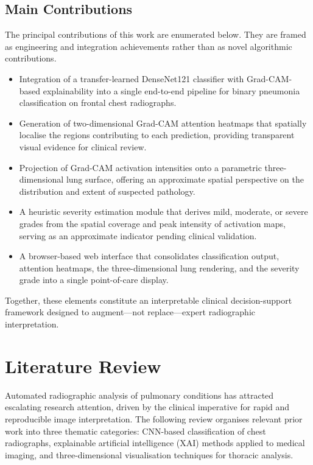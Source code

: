 \documentclass[conference]{IEEEtran}
\begin{document}
\subsection{Main Contributions}
The principal contributions of this work are enumerated below. They are framed as engineering and integration achievements rather than as novel algorithmic contributions.
\begin{itemize}
    \item Integration of a transfer-learned DenseNet121 classifier with Grad-CAM-based explainability into a single end-to-end pipeline for binary pneumonia classification on frontal chest radiographs.
    \item Generation of two-dimensional Grad-CAM attention heatmaps that spatially localise the regions contributing to each prediction, providing transparent visual evidence for clinical review.
    \item Projection of Grad-CAM activation intensities onto a parametric three-dimensional lung surface, offering an approximate spatial perspective on the distribution and extent of suspected pathology.
    \item A heuristic severity estimation module that derives mild, moderate, or severe grades from the spatial coverage and peak intensity of activation maps, serving as an approximate indicator pending clinical validation.
    \item A browser-based web interface that consolidates classification output, attention heatmaps, the three-dimensional lung rendering, and the severity grade into a single point-of-care display.
\end{itemize}
Together, these elements constitute an interpretable clinical decision-support framework designed to augment---not replace---expert radiographic interpretation.

\section{Literature Review}

\noindent\hspace{0.5cm}Automated radiographic analysis of pulmonary conditions has attracted escalating research attention, driven by the clinical imperative for rapid and reproducible image interpretation. The following review organises relevant prior work into three thematic categories: CNN-based classification of chest radiographs, explainable artificial intelligence (XAI) methods applied to medical imaging, and three-dimensional visualisation techniques for thoracic analysis.
\end{document}

